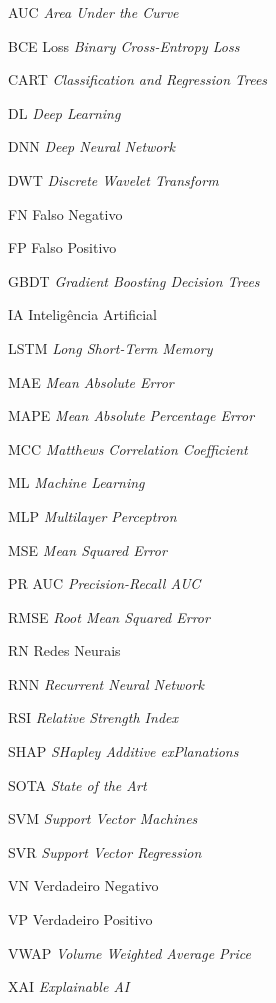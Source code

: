 \begin{siglas}
  \item[AUC] \textit{Area Under the Curve}
  \item[BCE Loss] \textit{Binary Cross-Entropy Loss}
  \item[CART] \textit{Classification and Regression Trees}
  \item[DL] \textit{Deep Learning}
  \item[DNN] \textit{Deep Neural Network}
  \item[DWT] \textit{Discrete Wavelet Transform}
  \item[FN] Falso Negativo
  \item[FP] Falso Positivo
  \item[GBDT] \textit{Gradient Boosting Decision Trees}
  \item[IA] Inteligência Artificial
  \item[LSTM] \textit{Long Short-Term Memory}
  \item[MAE] \textit{Mean Absolute Error}
  \item[MAPE] \textit{Mean Absolute Percentage Error}
  \item[MCC] \textit{Matthews Correlation Coefficient}
  \item[ML] \textit{Machine Learning}
  \item[MLP] \textit{Multilayer Perceptron}
  \item[MSE] \textit{Mean Squared Error}
  \item[PR AUC] \textit{Precision-Recall AUC}
  \item[RMSE] \textit{Root Mean Squared Error}
  \item[RN] Redes Neurais
  \item[RNN] \textit{Recurrent Neural Network}
  \item[RSI] \textit{Relative Strength Index}
  \item[SHAP] \textit{SHapley Additive exPlanations}
  \item[SOTA] \textit{State of the Art}
  \item[SVM] \textit{Support Vector Machines}
  \item[SVR] \textit{Support Vector Regression}
  \item[VN] Verdadeiro Negativo
  \item[VP] Verdadeiro Positivo
  \item[VWAP] \textit{Volume Weighted Average Price}
  \item[XAI] \textit{Explainable AI}
\end{siglas}
